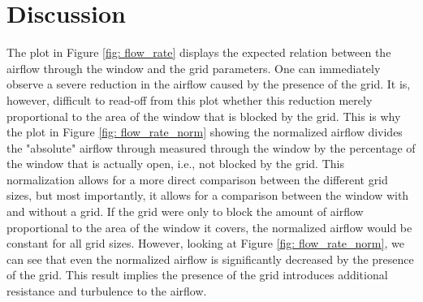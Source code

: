 \section{Discussion} \label{section: discussion}
The plot in Figure \ref{fig: flow_rate} displays the expected relation between the airflow through the window and the grid parameters. One can immediately observe a severe reduction in the airflow caused by the presence of the grid. It is, however, difficult to read-off from this plot whether this reduction merely proportional to the area of the window that is blocked by the grid. This is why the plot in
Figure \ref{fig: flow_rate_norm} showing the normalized airflow divides the "absolute" airflow through measured through the window by the percentage of the window that is actually open, i.e., not blocked by the grid. This normalization allows for a more direct comparison between the different grid sizes, but most importantly, it allows for a comparison between the window with and without a grid. If the grid were only to block the amount of airflow proportional to the area of the window it covers, the normalized airflow would be constant for all grid sizes. However, looking at Figure \ref{fig: flow_rate_norm}, we can see that even the normalized airflow is significantly decreased by the presence of the grid. This result implies the presence of the grid introduces additional resistance and turbulence to the airflow.